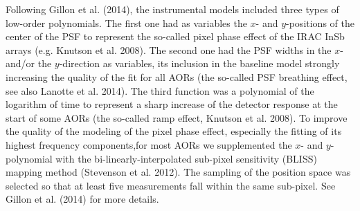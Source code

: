 \documentclass[traditabstract]{aa}
\begin{document}
Following Gillon et al. (2014), the instrumental models included three types of low-order polynomials. The first one 
had as variables the $x$- and $y$-positions of the center of the PSF to represent the so-called pixel phase effect of the IRAC
 InSb arrays (e.g. Knutson et al. 2008). The second one had  the PSF widths in the $x$- and/or the 
 $y$-direction as variables, its inclusion in the baseline model strongly increasing the quality of the fit for all AORs (the so-called PSF breathing effect, see also Lanotte et al. 2014). The third  function was a polynomial of the logarithm of time to represent a sharp increase of the detector response at the start of some AORs (the so-called ramp effect, Knutson et al. 2008). To improve the quality of the modeling of the
  pixel phase effect, especially the fitting of its highest frequency components,for most AORs  we supplemented the 
  $x$- and $y$-polynomial with the bi-linearly-interpolated sub-pixel sensitivity (BLISS) mapping method (Stevenson 
  et al. 2012). The sampling of the position space was selected so that at least five measurements fall within the 
  same sub-pixel. See Gillon et al. (2014) for more details.  
\end{document}
